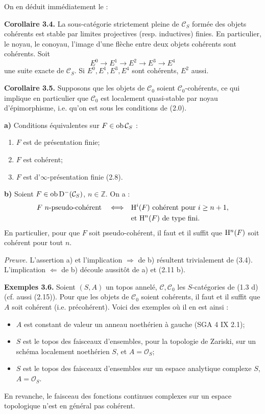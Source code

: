 \documentclass[11pt]{article}
\begin{document}
On en déduit immédiatement le :

\textbf{Corollaire 3.4.} La sous-catégorie strictement pleine de \(\mathcal C_S\) formée des objets cohérents est stable par limites projectives (resp. inductives) finies. En particulier, le noyau, le conoyau, l'image d'une flèche entre deux objets cohérents sont cohérents. Soit
\[
  E^0\longrightarrow E^1\longrightarrow E^2\longrightarrow E^3\longrightarrow E^4
\]
une suite exacte de \(\mathcal C_S\). Si \(E^0,E^1,E^3,E^4\) sont cohérents, \(E^2\) aussi.

\textbf{Corollaire 3.5.} Supposons que les objets de \(\mathcal C_0\) soient \(\mathcal C_0\)-cohérents, ce qui implique en particulier que \(\mathcal C_0\) est localement quasi-stable par noyau d'épimorphisme, i.e. qu'on est sous les conditions de (2.0).

\textbf{a)} Conditions équivalentes sur \(F\in\operatorname{ob}\mathcal C_S\) :
\begin{enumerate}[label=(\roman*)]
\item \(F\) est de présentation finie;
\item \(F\) est cohérent;
\item \(F\) est d'\(\infty\)-présentation finie (2.8).
\end{enumerate}

\textbf{b)} Soient \(F\in\operatorname{ob}\mathrm D^-(\mathcal C_S)\), \(n\in\mathbb Z\). On a :
\[
\begin{split}
F\ n\text{-pseudo-cohérent}
\quad\Longleftrightarrow\quad&
\mathrm H^i(F)\text{ cohérent pour }i\geq n+1,\\
&\text{et }\mathrm H^n(F)\text{ de type fini.}
\end{split}
\]
En particulier, pour que \(F\) soit pseudo-cohérent, il faut et il suffit que \(\mathrm H^n(F)\) soit cohérent pour tout \(n\).

\emph{Preuve.} L'assertion a) et l'implication \(\Rightarrow\) de b) résultent trivialement de (3.4). L'implication \(\Leftarrow\) de b) découle aussitôt de a) et (2.11 b).

\textbf{Exemples 3.6.} Soient \((S,A)\) un topos annelé, \(\mathcal C,\mathcal C_0\) les \(S\)-catégories de (1.3 d) (cf. aussi (2.15)). Pour que les objets de \(\mathcal C_0\) soient cohérents, il faut et il suffit que \(A\) soit cohérent (i.e. précohérent). Voici des exemples où il en est ainsi :
\begin{itemize}
\item \(A\) est constant de valeur un anneau noethérien à gauche (SGA 4 IX 2.1);
\item \(S\) est le topos des faisceaux d'ensembles, pour la topologie de Zariski, sur un schéma localement noethérien \(S\), et \(A=\mathcal O_S\);
\item \(S\) est le topos des faisceaux d'ensembles sur un espace analytique complexe \(S\), \(A=\mathcal O_S\).
\end{itemize}
En revanche, le faisceau des fonctions continues complexes sur un espace topologique n'est en général pas cohérent.
\end{document}
